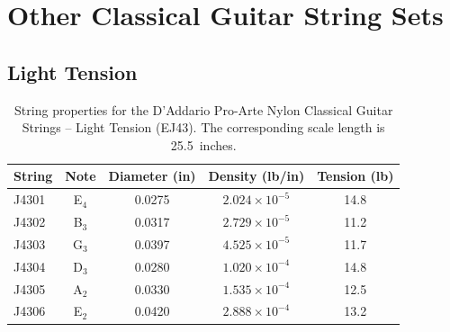 %
%
%

 \newpage
 \section{Other Classical Guitar String Sets\label{app:specs}}

 \subsection{Light Tension}

 \begin{table}[htbp]
  \centering
  \caption{\label{tbl:ej43_ips} String properties for the D'Addario Pro-Arte Nylon Classical Guitar Strings -- Light Tension (EJ43). The corresponding scale length is 25.5~inches.}
    \begin{tabular}{lcccc}
    \hline \hline
    String  & Note  & \multicolumn{1}{l}{Diameter (in)} & \multicolumn{1}{l}{Density (lb/in)} & \multicolumn{1}{l}{Tension (lb)} \\
    \hline
    J4301 & E$_4$  & 0.0275 & $2.024 \times 10^{-5}$ & 14.8 \\
    J4302 & B$_3$  & 0.0317 & $2.729 \times 10^{-5}$ & 11.2 \\
    J4303 & G$_3$  & 0.0397 & $4.525 \times 10^{-5}$ & 11.7 \\
    J4304 & D$_3$  & 0.0280 & $1.020 \times 10^{-4}$ & 14.8 \\
    J4305 & A$_2$  & 0.0330 & $1.535 \times 10^{-4}$ & 12.5 \\
    J4306 & E$_2$  & 0.0420 & $2.888 \times 10^{-4}$ & 13.2 \\
    \hline
    \end{tabular}%
 \end{table}%

